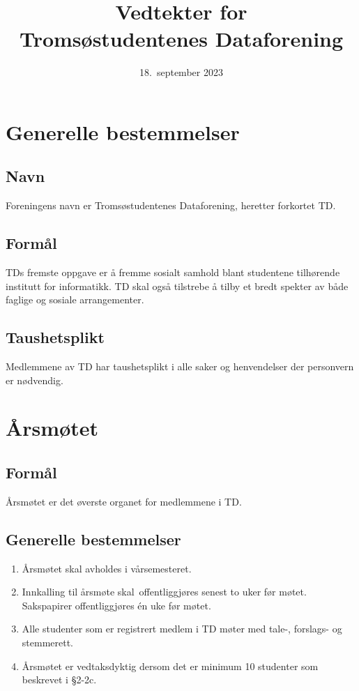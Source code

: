 \documentclass[11pt]{article}
\title{\Huge{Vedtekter for\\Tromsøstudentenes Dataforening}}
\date{18.\ september 2023}
\author{}
\begin{document}
\maketitle
\section{Generelle bestemmelser}
\subsection{Navn}
Foreningens navn er Tromsøstudentenes Dataforening, heretter forkortet TD.

\subsection{Formål}
TDs fremste oppgave er å fremme sosialt samhold blant studentene tilhørende institutt for informatikk.
TD skal også tilstrebe å tilby et bredt spekter av både faglige og sosiale arrangementer. 

\subsection{Taushetsplikt}
Medlemmene av TD har taushetsplikt i alle saker og henvendelser der personvern er nødvendig. 

\section{Årsmøtet}
\subsection{Formål}
Årsmøtet er det øverste organet for medlemmene i TD.

\subsection{Generelle bestemmelser}
\begin{enumerate}
	\item Årsmøtet skal avholdes i vårsemesteret.
	\item Innkalling til årsmøte skal offentliggjøres senest to uker før møtet. Sakspapirer offentliggjøres én uke før møtet. 
	\item Alle studenter som er registrert medlem i TD møter med tale-, forslags- og stemmerett. 
	\item Årsmøtet er vedtaksdyktig dersom det er minimum 10 studenter som beskrevet i §2-2c.
\end{enumerate}
\end{document}
